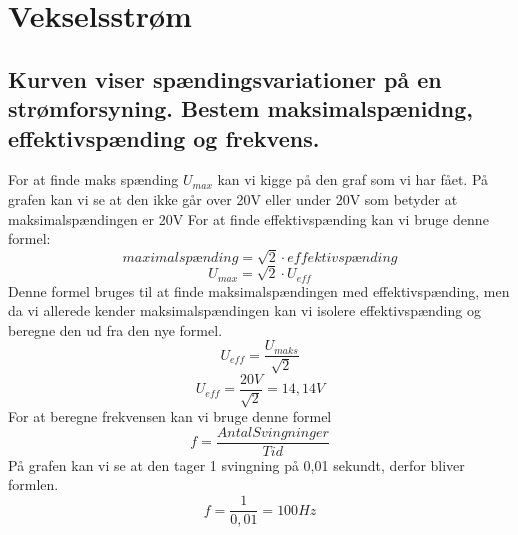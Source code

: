 \section{Vekselsstrøm}
\subsection{Kurven viser spændingsvariationer på en strømforsyning. Bestem maksimalspænidng, effektivspænding og frekvens.}
For at finde maks spænding \begin{math}U_{max}\end{math} kan vi kigge på den graf som vi har fået. På grafen kan vi se at den ikke går over 20V eller under 20V som betyder at maksimalspændingen er 20V\newline
For at finde effektivspænding kan vi bruge denne formel:
\begin{equation*}
    maximalspænding = \sqrt{2}\cdot effektivspænding
\end{equation*}
\begin{equation*}
    U_{max} = \sqrt{2}\cdot U_{eff}
\end{equation*}
Denne formel bruges til at finde maksimalspændingen med effektivspænding, men da vi allerede kender maksimalspændingen kan vi isolere effektivspænding og beregne den ud fra den nye formel.
\begin{equation*}
    U_{eff}=\frac{U_{maks}}{\sqrt{2}}
\end{equation*}
\begin{equation*}
    U_{eff}=\frac{20V}{\sqrt{2}}=14,14V
\end{equation*}
For at beregne frekvensen kan vi bruge denne formel
\begin{equation*}
    f=\frac{Antal Svingninger}{Tid}
\end{equation*}
På grafen kan vi se at den tager 1 svingning på 0,01 sekundt, derfor bliver formlen.
\begin{equation*}
    f=\frac{1}{0,01}=100Hz
\end{equation*}

